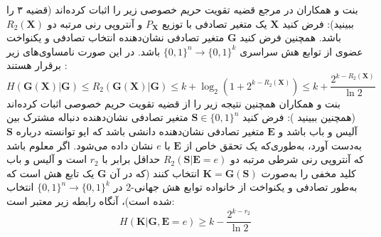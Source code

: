 بنت و همکاران در مرجع \cite{23} قضیه تقویت حریم خصوصی زیر را اثبات کرده‌اند (قضیه ۳ را ببینید): فرض کنید $\bm{X}$ یک متغیر تصادفی با توزیع $P_{\bm{X}}$ و آنتروپی رنی مرتبه دو $R_2(\bm{X})$ باشد. همچنین فرض کنید $\bm{G}$ متغیر تصادفی نشان‌دهنده انتخاب تصادفی و یکنواخت عضوی از توابع هش سراسری $\{0,1\}^n \to \{0,1\}^k$ باشد. در این صورت نامساوی‌های زیر برقرار هستند \cite{23}:
\begin{equation}
	H(\bm{G}(\bm{X})|\bm{G}) \leq R_2(\bm{G}(\bm{X})|\bm{G}) \leq k + \log_2 (1 + 2^{k-R_2(\bm{X})}) \leq k + \frac{2^{k-R_2(\bm{X})}}{\ln 2}
	\label{eq:6-65}
\end{equation}
بنت و همکاران همچنین نتیجه زیر را از قضیه تقویت حریم خصوصی اثبات کرده‌اند \cite{23} (همچنین ببینید \cite{110}): فرض کنید $\bm{S} \in \{0,1\}^n$ متغیر تصادفی نشان‌دهنده دنباله مشترک بین آلیس و باب باشد و $\bm{E}$ متغیر تصادفی نشان‌دهنده دانشی باشد که ایو توانسته درباره $\bm{S}$ به‌دست آورد، به‌طوری‌که یک تحقق خاص از $\bm{E}$ با $e$ نشان داده می‌شود. اگر معلوم باشد که آنتروپی رنی شرطی مرتبه دو $R_2(\bm{S}|\bm{E}=e)$ حداقل برابر با $r_2$ است و آلیس و باب کلید مخفی را به‌صورت $\bm{K} = \bm{G}(\bm{S})$ انتخاب کنند (که در آن $\bm{G}$ یک تابع هش است که به‌طور تصادفی و یکنواخت از خانواده توابع هش جهانی-$2$ در $\{0,1\}^n \to \{0,1\}^k$ انتخاب شده است)، آنگاه رابطه زیر معتبر است:
\begin{equation}
	H(\bm{K}|\bm{G}, \bm{E}=e) \geq k - \frac{2^{k-r_2}}{\ln 2}
	\label{eq:6-66}
\end{equation}

